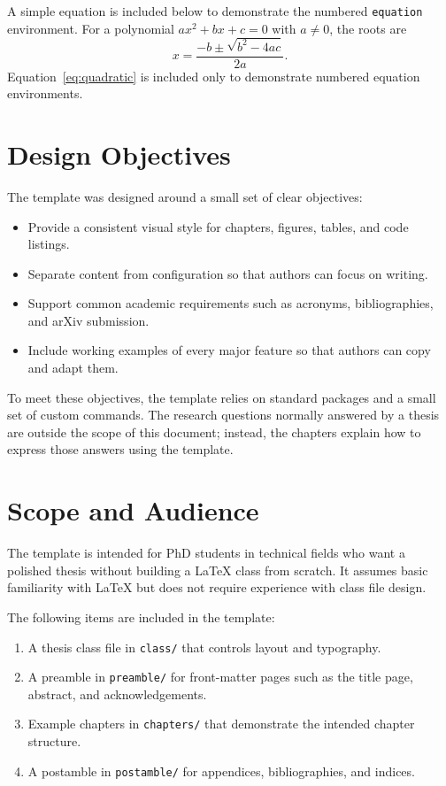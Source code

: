 A simple equation is included below to demonstrate the numbered \texttt{equation} environment. For a polynomial $ax^2 + bx + c = 0$ with $a \neq 0$, the roots are
\begin{equation}
\label{eq:quadratic}
x = \frac{-b \pm \sqrt{b^2 - 4ac}}{2a}.
\end{equation}
Equation~\eqref{eq:quadratic} is included only to demonstrate numbered equation environments.


\section{Design Objectives}\label{ch1sec:objectives}

The template was designed around a small set of clear objectives:

\begin{itemize}
\item Provide a consistent visual style for chapters, figures, tables, and code listings.
\item Separate content from configuration so that authors can focus on writing.
\item Support common academic requirements such as acronyms, bibliographies, and arXiv submission.
\item Include working examples of every major feature so that authors can copy and adapt them.
\end{itemize}

To meet these objectives, the template relies on standard packages and a small set of custom commands. The research questions normally answered by a thesis are outside the scope of this document; instead, the chapters explain how to express those answers using the template.


\section{Scope and Audience}\label{ch1sec:scope}

The template is intended for PhD students in technical fields who want a polished thesis without building a \LaTeX{} class from scratch. It assumes basic familiarity with \LaTeX{} but does not require experience with class file design.

The following items are included in the template:

\begin{enumerate}
\item A thesis class file in \texttt{class/} that controls layout and typography.
\item A preamble in \texttt{preamble/} for front-matter pages such as the title page, abstract, and acknowledgements.
\item Example chapters in \texttt{chapters/} that demonstrate the intended chapter structure.
\item A postamble in \texttt{postamble/} for appendices, bibliographies, and indices.
\end{enumerate}

